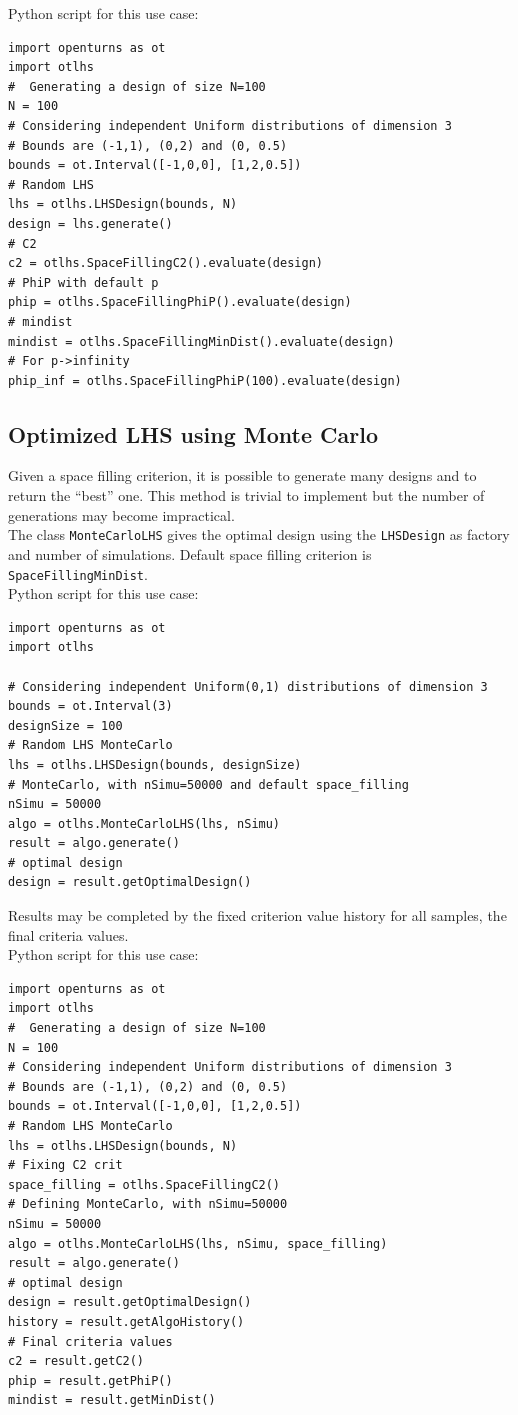 Python script for this use case:

\begin{lstlisting}
import openturns as ot
import otlhs
#  Generating a design of size N=100
N = 100
# Considering independent Uniform distributions of dimension 3
# Bounds are (-1,1), (0,2) and (0, 0.5)
bounds = ot.Interval([-1,0,0], [1,2,0.5])
# Random LHS
lhs = otlhs.LHSDesign(bounds, N)
design = lhs.generate()
# C2
c2 = otlhs.SpaceFillingC2().evaluate(design)
# PhiP with default p
phip = otlhs.SpaceFillingPhiP().evaluate(design)
# mindist
mindist = otlhs.SpaceFillingMinDist().evaluate(design)
# For p->infinity
phip_inf = otlhs.SpaceFillingPhiP(100).evaluate(design)
\end{lstlisting}

\subsection{Optimized LHS using Monte Carlo}
Given a space filling criterion, it is possible to generate many designs and to return the ``best'' one. This method is trivial to implement but the number of generations may become impractical.\\

The class \texttt{MonteCarloLHS} gives the optimal design using the \texttt{LHSDesign} as factory and number of simulations.
Default space filling criterion is \texttt{SpaceFillingMinDist}.\\
Python script for this use case:

\begin{lstlisting}
import openturns as ot
import otlhs

# Considering independent Uniform(0,1) distributions of dimension 3
bounds = ot.Interval(3)
designSize = 100
# Random LHS MonteCarlo
lhs = otlhs.LHSDesign(bounds, designSize)
# MonteCarlo, with nSimu=50000 and default space_filling
nSimu = 50000
algo = otlhs.MonteCarloLHS(lhs, nSimu)
result = algo.generate()
# optimal design
design = result.getOptimalDesign()
\end{lstlisting}

Results may be completed by the fixed criterion value history for all samples, the final criteria values.\\
Python script for this use case:
\begin{lstlisting}
import openturns as ot
import otlhs
#  Generating a design of size N=100
N = 100
# Considering independent Uniform distributions of dimension 3
# Bounds are (-1,1), (0,2) and (0, 0.5)
bounds = ot.Interval([-1,0,0], [1,2,0.5])
# Random LHS MonteCarlo
lhs = otlhs.LHSDesign(bounds, N)
# Fixing C2 crit
space_filling = otlhs.SpaceFillingC2()
# Defining MonteCarlo, with nSimu=50000
nSimu = 50000
algo = otlhs.MonteCarloLHS(lhs, nSimu, space_filling)
result = algo.generate()
# optimal design
design = result.getOptimalDesign()
history = result.getAlgoHistory()
# Final criteria values
c2 = result.getC2()
phip = result.getPhiP()
mindist = result.getMinDist()
\end{lstlisting}

